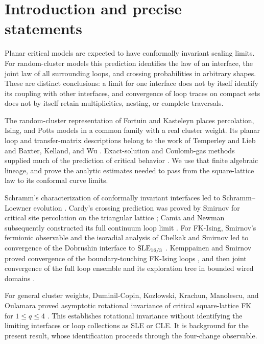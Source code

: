 \section{Introduction and precise statements}\label{sec:introduction}

Planar critical models are expected to have conformally invariant scaling
limits.  For random-cluster models this prediction identifies the law of an
interface, the joint law of all surrounding loops, and crossing
probabilities in arbitrary shapes.  These are distinct conclusions: a
limit for one interface does not by itself identify its coupling with
other interfaces, and convergence of loop traces on compact sets does not
by itself retain multiplicities, nesting, or complete traversals.

The random-cluster representation of Fortuin and Kasteleyn
\citep{FortuinKasteleyn1972} places percolation, Ising, and Potts models
in a common family with a real cluster weight.  Its planar loop and
transfer-matrix descriptions belong to the work of Temperley and Lieb
\citep{TemperleyLieb1971} and Baxter, Kelland, and Wu
\citep{BaxterKellandWu1976}.  Exact-solution and Coulomb-gas methods supplied
much of the prediction of critical behavior
\citep{Baxter1973,Nienhuis1984}.  We use that finite algebraic lineage,
and prove the analytic estimates needed to pass from the square-lattice
law to its conformal curve limits.

Schramm's characterization of conformally invariant interfaces led to
Schramm--Loewner evolution \citep{Schramm2000}.  Cardy's crossing prediction
\citep{Cardy1992} was proved by Smirnov for critical site percolation on
the triangular lattice \citep{Smirnov2001}; Camia and Newman subsequently
constructed its full continuum loop limit \citep{CamiaNewman2006Full}.
For FK-Ising, Smirnov's fermionic observable \citep{Smirnov2010} and the
isoradial analysis of Chelkak and Smirnov \citep{ChelkakSmirnov2012} led
to convergence of the Dobrushin interface to $\operatorname{SLE}_{16/3}$
\citep{ChelkakDCHonglerKemppainenSmirnov2014}.  Kemppainen and Smirnov
proved convergence of the boundary-touching FK-Ising loops
\citep{KemppainenSmirnov2019}, and then joint convergence of the full loop
ensemble and its exploration tree in bounded wired domains
\citep{KemppainenSmirnov2016FullScalingLimit}.

For general cluster weights, Duminil-Copin, Kozlowski, Krachun,
Manolescu, and Oulamara proved asymptotic rotational invariance of
critical square-lattice FK for $1\le q\le4$
\citep[Theorem~1.2]{DCKKMO2026Rotation}.
This establishes rotational invariance without identifying the limiting
interfaces or loop collections as SLE or CLE.  It is background for the
present result, whose identification proceeds through the four-change
observable.

